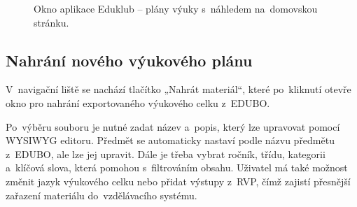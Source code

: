 \documentclass[male,czech,api_bc]{kitheses}
\begin{document}
\begin{figure}[H]
	\centering
	\caption{Okno aplikace Eduklub – plány výuky s~náhledem na~domovskou stránku.}
	\label{fig:eduklub-1}
\end{figure}

\subsection{Nahrání nového výukového plánu}

V~navigační liště se nachází tlačítko „Nahrát materiál“, které po~kliknutí otevře okno pro nahrání exportovaného výukového celku z~EDUBO.

Po~výběru souboru je nutné zadat název a~popis, který lze upravovat pomocí WYSIWYG editoru. Předmět se automaticky nastaví podle názvu předmětu z~EDUBO, ale lze jej upravit. Dále je třeba vybrat ročník, třídu, kategorii a~klíčová slova, která pomohou s~filtrováním obsahu. Uživatel má také možnost změnit jazyk výukového celku nebo přidat výstupy z~RVP, čímž zajistí přesnější zařazení materiálu do~vzdělávacího systému.
\end{document}
